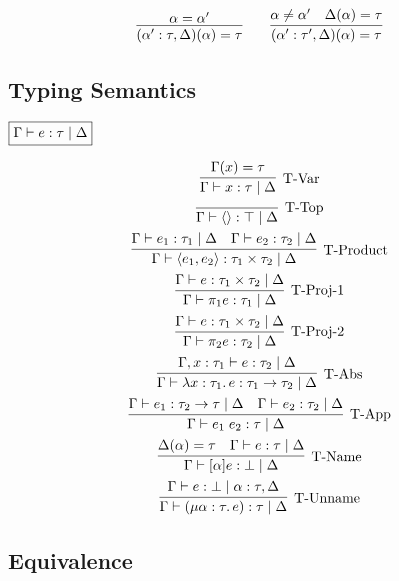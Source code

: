 \begin{gather*}
  \infer{(\alpha': \tau, \Delta)(\alpha) = \tau}{
    \alpha = \alpha'
  }
  \hspace{2em}
  \infer{(\alpha': \tau', \Delta)(\alpha) = \tau}{
    \alpha \neq \alpha'
    &
    \Delta(\alpha) = \tau
  }
\end{gather*}

\subsection{Typing Semantics}

$\fbox{$\Gamma \vdash e: \tau \mid \Delta$}$

\begin{gather*}
  \infer[\text{T-Var}]{\Gamma \vdash x: \tau \mid \Delta}{
    \Gamma(x) = \tau
  }
  \\
  \infer[\text{T-Top}]{\Gamma \vdash \langle\rangle: \top \mid \Delta}{}
  \\
  \infer[\text{T-Product}]{\Gamma \vdash \langle e_1, e_2\rangle: \tau_1 \times \tau_2 \mid \Delta}{
    \Gamma \vdash e_1: \tau_1 \mid \Delta
    &
    \Gamma \vdash e_2: \tau_2 \mid \Delta
  }
  \\
  \infer[\text{T-Proj-1}]{\Gamma \vdash \pi_1 e: \tau_1 \mid \Delta}{
    \Gamma \vdash e: \tau_1 \times \tau_2 \mid \Delta
  }
  \\
  \infer[\text{T-Proj-2}]{\Gamma \vdash \pi_2 e: \tau_2 \mid \Delta}{
    \Gamma \vdash e: \tau_1 \times \tau_2 \mid \Delta
  }
  \\
  \infer[\text{T-Abs}]{\Gamma \vdash \lambda x: \tau_1\ldotp e: \tau_1 \to \tau_2 \mid \Delta}{
    \Gamma, x: \tau_1 \vdash e: \tau_2 \mid \Delta
  }
  \\
  \infer[\text{T-App}]{\Gamma \vdash e_1\; e_2: \tau \mid \Delta}{
    \Gamma \vdash e_1: \tau_2 \to \tau \mid \Delta
    &
    \Gamma \vdash e_2: \tau_2 \mid \Delta
  }
  \\
  \infer[\text{T-Name}]{\Gamma \vdash [\alpha] e: \bot \mid \Delta}{
    \Delta(\alpha) = \tau
    &
    \Gamma \vdash e: \tau \mid \Delta
  }
  \\
  \infer[\text{T-Unname}]{\Gamma \vdash (\mu \alpha: \tau\ldotp e): \tau \mid \Delta}{
    \Gamma \vdash e: \bot \mid \alpha: \tau, \Delta
  }
\end{gather*}

\subsection{Equivalence}

